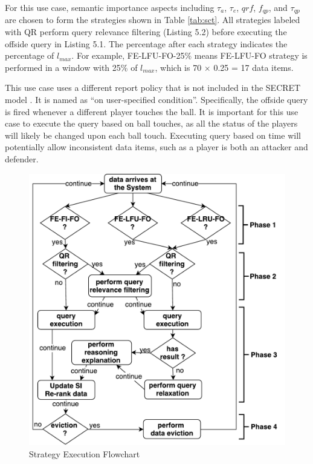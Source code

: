 For this use case, semantic importance aspects including $\tau_{a}$, $\tau_{e}$, $qrf$, $f_{qp}$, and $\tau_{qp}$ are chosen to form the strategies shown in Table \ref{tab:sct}. 
All strategies labeled with QR perform query relevance filtering (Listing 5.2) before executing the offside query in Listing 5.1. 
The percentage after each strategy indicates the percentage of $l_{max}$. 
For example, FE-LFU-FO-25\% means FE-LFU-FO strategy is performed in a window with 25\% of $l_{max}$, which is 70 $\times$ 0.25 = 17 data items.

This use case uses a different report policy that is not included in the SECRET model \cite{botan2010secret}.
It is named as ``on user-specified condition''. 
Specifically, the offside query is fired whenever a different player touches the ball.
It is important for this use case to execute the query based on ball touches, as all the status of the players will likely be changed upon each ball touch. 
Executing query based on time will potentially allow inconsistent data items, such as a player is both an attacker and defender. 

\begin{figure}[!htbp]
	\centering
	\includegraphics[width=5in]{img/5-strategyexe.pdf}
	\caption{Strategy Execution Flowchart}
	\label{fig:strExe}
\end{figure}

